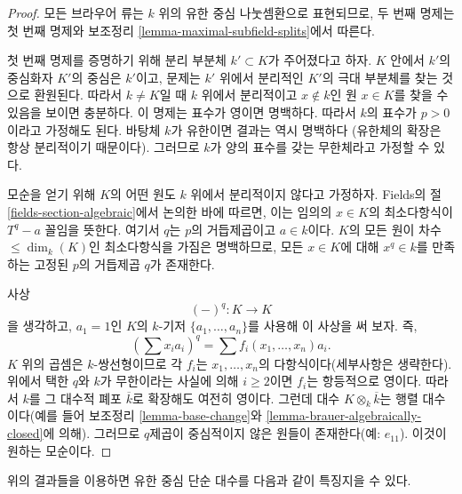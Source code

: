 \begin{proof}
모든 브라우어 류는 $k$ 위의 유한 중심 나눗셈환으로 표현되므로, 두 번째
명제는 첫 번째 명제와 보조정리 \ref{lemma-maximal-subfield-splits}에서 따른다.

\medskip\noindent
첫 번째 명제를 증명하기 위해 분리 부분체 $k' \subset K$가 주어졌다고 하자.
$K$ 안에서 $k'$의 중심화자 $K'$의 중심은 $k'$이고, 문제는 $k'$ 위에서
분리적인 $K'$의 극대 부분체를 찾는 것으로 환원된다. 따라서 $k \not = K$일
때 $k$ 위에서 분리적이고 $x \not \in k$인 원 $x \in K$를 찾을 수 있음을
보이면 충분하다. 이 명제는 표수가 영이면 명백하다. 따라서 $k$의 표수가
$p > 0$이라고 가정해도 된다. 바탕체 $k$가 유한이면 결과는 역시 명백하다
(유한체의 확장은 항상 분리적이기 때문이다). 그러므로 $k$가 양의 표수를
갖는 무한체라고 가정할 수 있다.

\medskip\noindent
모순을 얻기 위해 $K$의 어떤 원도 $k$ 위에서 분리적이지 않다고 가정하자.
Fields의 절 \ref{fields-section-algebraic}에서 논의한 바에 따르면, 이는
임의의 $x \in K$의 최소다항식이 $T^q - a$ 꼴임을 뜻한다. 여기서 $q$는
$p$의 거듭제곱이고 $a \in k$이다. $K$의 모든 원이 차수
$\leq \dim_k(K)$인 최소다항식을 가짐은 명백하므로, 모든 $x \in K$에 대해
$x^q \in k$를 만족하는 고정된 $p$의 거듭제곱 $q$가 존재한다.

\medskip\noindent
사상
$$
(-)^q : K \longrightarrow K
$$
을 생각하고, $a_1 = 1$인 $K$의 $k$-기저
$\{a_1, \ldots, a_n\}$를 사용해 이 사상을 써 보자. 즉,
$$
(\sum x_i a_i)^q = \sum f_i(x_1, \ldots, x_n)a_i.
$$
$K$ 위의 곱셈은 $k$-쌍선형이므로 각 $f_i$는
$x_1, \ldots, x_n$의 다항식이다(세부사항은 생략한다). 위에서 택한
$q$와 $k$가 무한이라는 사실에 의해 $i \geq 2$이면 $f_i$는 항등적으로
영이다. 따라서 $k$를 그 대수적 폐포 $\overline{k}$로 확장해도 여전히
영이다. 그런데 대수 $K \otimes_k \overline{k}$는 행렬 대수이다(예를 들어
보조정리 \ref{lemma-base-change}와
\ref{lemma-brauer-algebraically-closed}에 의해). 그러므로 $q$제곱이 중심적이지
않은 원들이 존재한다(예: $e_{11}$). 이것이 원하는 모순이다.
\end{proof}

\noindent
위의 결과들을 이용하면 유한 중심 단순 대수를 다음과 같이 특징지을 수 있다.

